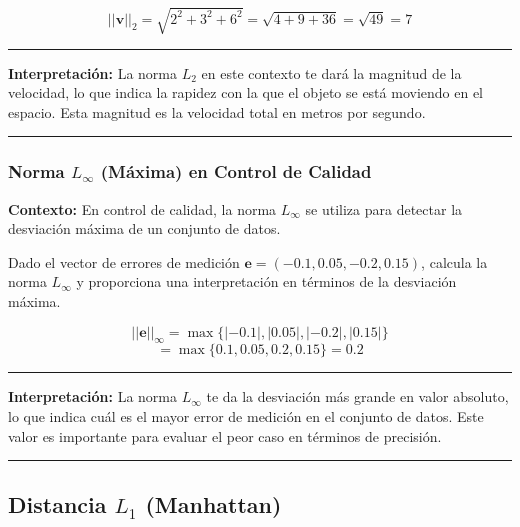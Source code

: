 \documentclass[
  letterpaper,
  DIV=11,
  numbers=noendperiod]{scrartcl}
\begin{document}
\[
||\mathbf{v}||_2 = \sqrt{2^2 + 3^2 + 6^2} = \sqrt{4 + 9 + 36} = \sqrt{49} = 7
\]

\begin{center}\rule{0.5\linewidth}{0.5pt}\end{center}

\textbf{Interpretación:} La norma \(L_2\) en este contexto te dará la
magnitud de la velocidad, lo que indica la rapidez con la que el objeto
se está moviendo en el espacio. Esta magnitud es la velocidad total en
metros por segundo.

\begin{center}\rule{0.5\linewidth}{0.5pt}\end{center}

\subsubsection{\texorpdfstring{Norma \(L_\infty\) (Máxima) en Control de
Calidad}{Norma L\_\textbackslash infty (Máxima) en Control de Calidad}}\label{norma-l_infty-muxe1xima-en-control-de-calidad}

\textbf{Contexto:} En control de calidad, la norma \(L_\infty\) se
utiliza para detectar la desviación máxima de un conjunto de datos.

Dado el vector de errores de medición
\(\mathbf{e} = (-0.1, 0.05, -0.2, 0.15)\), calcula la norma \(L_\infty\)
y proporciona una interpretación en términos de la desviación máxima.

\[
||\mathbf{e}||_\infty = \max \{|-0.1|, |0.05|, |-0.2|, |0.15|\}
\] \[ = \max \{0.1, 0.05, 0.2, 0.15\} = 0.2
\]

\begin{center}\rule{0.5\linewidth}{0.5pt}\end{center}

\textbf{Interpretación:} La norma \(L_\infty\) te da la desviación más
grande en valor absoluto, lo que indica cuál es el mayor error de
medición en el conjunto de datos. Este valor es importante para evaluar
el peor caso en términos de precisión.

\begin{center}\rule{0.5\linewidth}{0.5pt}\end{center}

\subsection{\texorpdfstring{Distancia \(L_1\)
(Manhattan)}{Distancia L\_1 (Manhattan)}}\label{distancia-l_1-manhattan}
\end{document}

